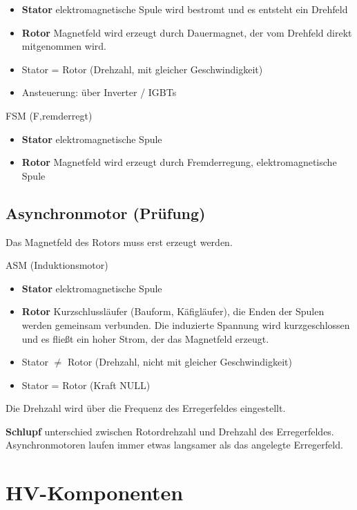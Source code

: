 \begin{itemize}
\item
  \textbf{Stator} elektromagnetische Spule wird bestromt und es entsteht
  ein Drehfeld
\item
  \textbf{Rotor} Magnetfeld wird erzeugt durch Dauermagnet, der vom
  Drehfeld direkt mitgenommen wird.
\item
  Stator = Rotor (Drehzahl, mit gleicher Geschwindigkeit)
\item
  Ansteuerung: über Inverter / IGBTs
\end{itemize}

FSM (F‚remderregt)

\begin{itemize}
\item
  \textbf{Stator} elektromagnetische Spule
\item
  \textbf{Rotor} Magnetfeld wird erzeugt durch Fremderregung,
  elektromagnetische Spule
\end{itemize}

\subsection{Asynchronmotor (Prüfung)}\label{asynchronmotor-pruefung}

Das Magnetfeld des Rotors muss erst erzeugt werden.

ASM (Induktionsmotor)

\begin{itemize}
\item
  \textbf{Stator} elektromagnetische Spule
\item
  \textbf{Rotor} Kurzschlussläufer (Bauform, Käfigläufer), die Enden der
  Spulen werden gemeinsam verbunden. Die induzierte Spannung wird
  kurzgeschlossen und es fließt ein hoher Strom, der das Magnetfeld
  erzeugt.
\item
  Stator $\neq$ Rotor (Drehzahl, nicht mit gleicher Geschwindigkeit)
\item
  Stator = Rotor (Kraft NULL)
\end{itemize}

Die Drehzahl wird über die Frequenz des Erregerfeldes eingestellt.

\textbf{Schlupf} unterschied zwischen Rotordrehzahl und Drehzahl des
Erregerfeldes. Asynchronmotoren laufen immer etwas langsamer als das
angelegte Erregerfeld.

\section{HV-Komponenten}\label{hv-komponenten}

